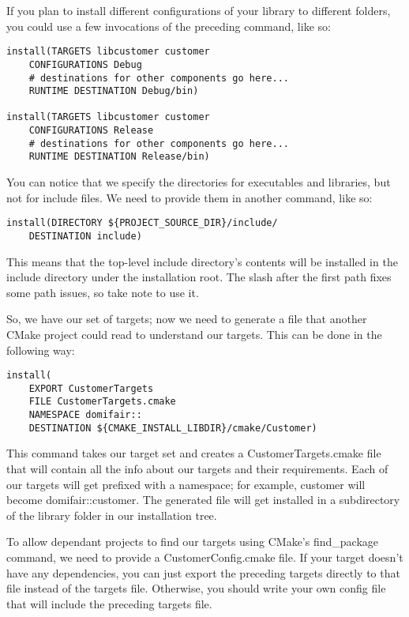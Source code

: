 If you plan to install different configurations of your library to different folders, you could use a few invocations of the preceding command, like so:

\begin{lstlisting}[style=styleCMake]
install(TARGETS libcustomer customer
	CONFIGURATIONS Debug
	# destinations for other components go here...
	RUNTIME DESTINATION Debug/bin)
	
install(TARGETS libcustomer customer
	CONFIGURATIONS Release
	# destinations for other components go here...
	RUNTIME DESTINATION Release/bin)
\end{lstlisting}

You can notice that we specify the directories for executables and libraries, but not for include files. We need to provide them in another command, like so:

\begin{lstlisting}[style=styleCMake]
install(DIRECTORY ${PROJECT_SOURCE_DIR}/include/
	DESTINATION include)
\end{lstlisting}

This means that the top-level include directory's contents will be installed in the include directory under the installation root. The slash after the first path fixes some path issues, so take note to use it.

So, we have our set of targets; now we need to generate a file that another CMake project could read to understand our targets. This can be done in the following way:

\begin{lstlisting}[style=styleCMake]
install(
	EXPORT CustomerTargets
	FILE CustomerTargets.cmake
	NAMESPACE domifair::
	DESTINATION ${CMAKE_INSTALL_LIBDIR}/cmake/Customer)
\end{lstlisting}

This command takes our target set and creates a CustomerTargets.cmake file that will contain all the info about our targets and their requirements. Each of our targets will get prefixed with a namespace; for example, customer will become domifair::customer. The generated file will get installed in a subdirectory of the library folder in our installation tree.

To allow dependant projects to find our targets using CMake's find\_package command, we need to provide a CustomerConfig.cmake file. If your target doesn't have any dependencies, you can just export the preceding targets directly to that file instead of the targets file. Otherwise, you should write your own config file that will include the preceding targets file.

